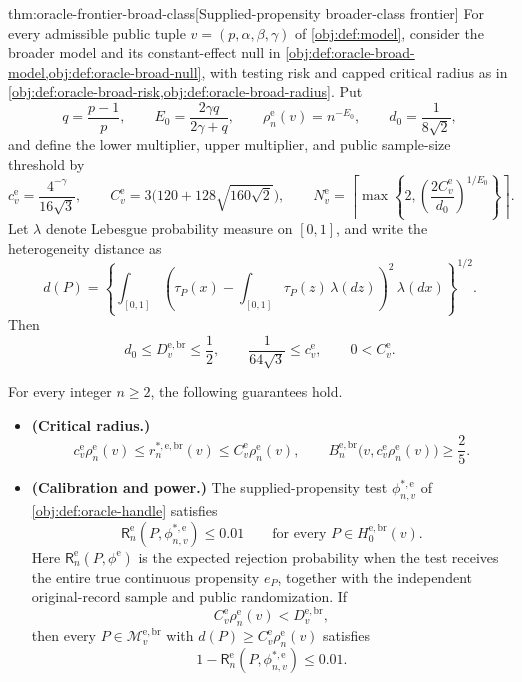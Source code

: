 \begin{theoremv}{thm:oracle-frontier-broad-class}[Supplied-propensity broader-class frontier]
For every admissible public tuple \(v=(p,\alpha,\beta,\gamma)\) of \cref{obj:def:model}, consider the broader model and its constant-effect null in \cref{obj:def:oracle-broad-model,obj:def:oracle-broad-null}, with testing risk and capped critical radius as in \cref{obj:def:oracle-broad-risk,obj:def:oracle-broad-radius}. Put
\[
q=\frac{p-1}{p},\qquad
E_0=\frac{2\gamma q}{2\gamma+q},\qquad
\rho_n^{\mathrm e}(v)=n^{-E_0},\qquad
d_0=\frac{1}{8\sqrt2},
\]
and define the lower multiplier, upper multiplier, and public sample-size threshold by
\[
c_v^{\mathrm e}=\frac{4^{-\gamma}}{16\sqrt3},\qquad
C_v^{\mathrm e}=3\bigl(120+128\sqrt{160\sqrt2}\bigr),\qquad
N_v^{\mathrm e}
=\left\lceil\max\left\{2,
\left(\frac{2C_v^{\mathrm e}}{d_0}\right)^{1/E_0}
\right\}\right\rceil .
\]
Let \(\lambda\) denote Lebesgue probability measure on \([0,1]\), and write the heterogeneity distance as
\[
d(P)=
\left\{\int_{[0,1]}
\left(\tau_P(x)-\int_{[0,1]}\tau_P(z)\,\lambda(dz)\right)^2
\,\lambda(dx)\right\}^{1/2}.
\]
Then
\[
d_0\le D_v^{\mathrm{e,br}}\le\frac12,\qquad
\frac{1}{64\sqrt3}\le c_v^{\mathrm e},\qquad
0<C_v^{\mathrm e}.
\]

For every integer \(n\ge2\), the following guarantees hold.
\begin{itemize}
\item \textbf{(Critical radius.)}
\[
c_v^{\mathrm e}\rho_n^{\mathrm e}(v)
\le r_n^{*,\mathrm{e,br}}(v)
\le C_v^{\mathrm e}\rho_n^{\mathrm e}(v),
\qquad
B_n^{\mathrm{e,br}}
\bigl(v,c_v^{\mathrm e}\rho_n^{\mathrm e}(v)\bigr)
\ge\frac25.
\]

\item \textbf{(Calibration and power.)}
The supplied-propensity test \(\phi^{*,\mathrm e}_{n,v}\) of
\cref{obj:def:oracle-handle} satisfies
\[
\mathsf R_n^{\mathrm e}
(P,\phi^{*,\mathrm e}_{n,v})\le0.01
\qquad
\text{for every }P\in H_0^{\mathrm{e,br}}(v).
\]
Here \(\mathsf R_n^{\mathrm e}(P,\phi^{\mathrm e})\) is the expected rejection probability when the test receives the entire true continuous propensity \(e_P\), together with the independent original-record sample and public randomization. If
\[
C_v^{\mathrm e}\rho_n^{\mathrm e}(v)<D_v^{\mathrm{e,br}},
\]
then every \(P\in\mathcal M_v^{\mathrm{e,br}}\) with
\(d(P)\ge C_v^{\mathrm e}\rho_n^{\mathrm e}(v)\) satisfies
\[
1-\mathsf R_n^{\mathrm e}
(P,\phi^{*,\mathrm e}_{n,v})\le0.01.
\]


\end{itemize}
\end{theoremv}

